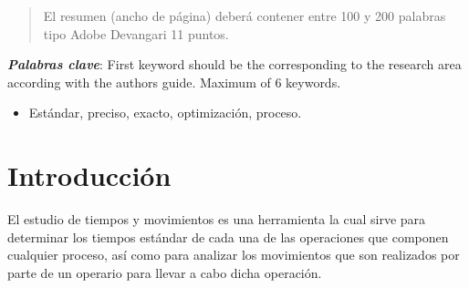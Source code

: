         
        
        
        \maketitle
        \thispagestyle{fancy}
        
        
        
        \begin{abstract}
        \noindent 
        El resumen (ancho de página) deberá contener entre 100 y 200 palabras tipo Adobe Devangari 11 puntos.
        
        \end{abstract}
        \textbf{\textit{Palabras clave}}: {First keyword should be the corresponding to the research area according with the authors guide. Maximum of 6 keywords.}
        \begin{itemize}
            \item Estándar, preciso, exacto, optimización, proceso.
        \end{itemize}
        
        \section{Introducción}
        
        
        El estudio de tiempos y movimientos es una herramienta la cual sirve para determinar los tiempos estándar de cada una de las operaciones que componen cualquier proceso, así como para analizar los movimientos que son realizados por parte de un operario para llevar a cabo dicha operación.
        
